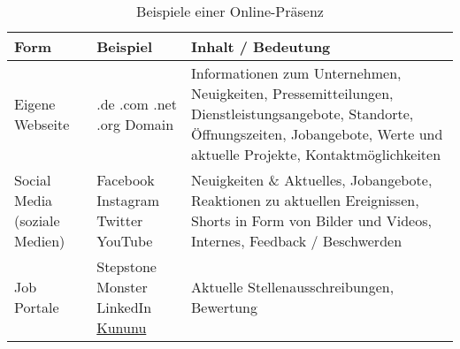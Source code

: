 \begin{table}[H]
\centering
\caption{Beispiele einer Online-Präsenz}
\label{tab:beispiele}
\begin{tabular}{ | p{4cm} | p{3cm} | p{6cm} | }
\hline
Form & Beispiel & Inhalt / Bedeutung \\ 
\hline
Eigene Webseite &
.de \newline
.com \newline 
.net \newline
.org \newline
Domain
&
Informationen zum Unternehmen, \newline
Neuigkeiten, \newline
Pressemitteilungen, \newline
Dienstleistungsangebote, \newline
Standorte, \newline
Öffnungszeiten, \newline
Jobangebote, \newline
Werte und aktuelle Projekte, \newline
Kontaktmöglichkeiten \\
\hline
Social Media \newline (soziale Medien) &
Facebook \newline
Instagram \newline
Twitter \newline
YouTube
&
Neuigkeiten \& Aktuelles, \newline
Jobangebote, \newline
Reaktionen zu aktuellen Ereignissen, \newline
Shorts in Form von Bilder und Videos, \newline
Internes, \newline
Feedback / Beschwerden
\\ \hline
Job Portale & 
Stepstone \newline
Monster \newline
LinkedIn \newline
\href{https://www.kununu.com/}{Kununu} \newline
&Aktuelle Stellenausschreibungen, \newline
Bewertung
\\ \hline
\end{tabular}
\end{table}

